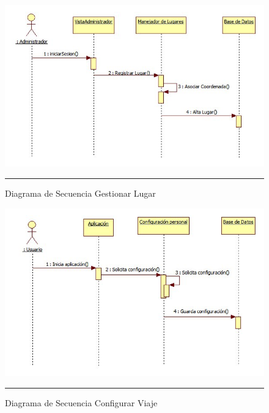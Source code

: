 \begin{figure}[h]
	\centering
		\includegraphics[width=1\textwidth]{Figuras/secGestionarLugar.png}
		\rule{30em}{0.5pt}
	\caption[Diagrama de Secuencia Gestionar Lugar]{Diagrama de Secuencia Gestionar Lugar}
	\label{fig:secGestionarLugar}
\end{figure}

\begin{figure}[h]
	\centering
		\includegraphics[width=1\textwidth]{Figuras/secConfigurarViaje.png}
		\rule{30em}{0.5pt}
	\caption[Diagrama de Secuencia Configurar Viaje]{Diagrama de Secuencia Configurar Viaje}
	\label{fig:secConfigurarViaje}
\end{figure}

